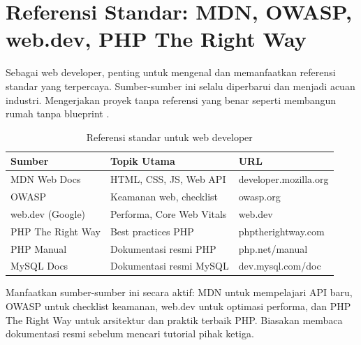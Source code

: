 \section[Referensi Standar: MDN, OWASP, web.dev, PHP The Right Way]{Referensi Standar: MDN, OWASP, web.dev, PHP The Right Way}

Sebagai web developer, penting untuk mengenal dan memanfaatkan referensi standar yang terpercaya. Sumber-sumber ini selalu diperbarui dan menjadi acuan industri. Mengerjakan proyek tanpa referensi yang benar seperti membangun rumah tanpa blueprint \cite{phpRightWay}.

\begin{table}[ht]
\centering
\begin{tabular}{|P{3cm}|P{4cm}|P{5.5cm}|}
\hline
\textbf{Sumber} & \textbf{Topik Utama} & \textbf{URL} \\
\hline
MDN Web Docs & HTML, CSS, JS, Web API & developer.mozilla.org \\
\hline
OWASP & Keamanan web, checklist & owasp.org \\
\hline
web.dev (Google) & Performa, Core Web Vitals & web.dev \\
\hline
PHP The Right Way & Best practices PHP & phptherightway.com \\
\hline
PHP Manual & Dokumentasi resmi PHP & php.net/manual \\
\hline
MySQL Docs & Dokumentasi resmi MySQL & dev.mysql.com/doc \\
\hline
\end{tabular}
\caption{Referensi standar untuk web developer}
\end{table}

Manfaatkan sumber-sumber ini secara aktif: MDN untuk mempelajari API baru, OWASP untuk checklist keamanan, web.dev untuk optimasi performa, dan PHP The Right Way untuk arsitektur dan praktik terbaik PHP. Biasakan membaca dokumentasi resmi sebelum mencari tutorial pihak ketiga.

